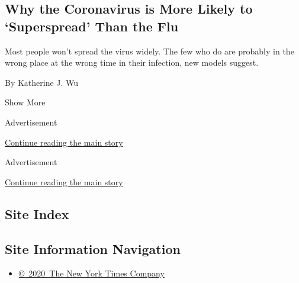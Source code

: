 \begin{enumerate}
  \hypertarget{why-the-coronavirus-is-more-likely-to-superspread-than-the-flu}{%
  \subsection{Why the Coronavirus is More Likely to `Superspread' Than
  the
  Flu}\label{why-the-coronavirus-is-more-likely-to-superspread-than-the-flu}}

  Most people won't spread the virus widely. The few who do are probably
  in the wrong place at the wrong time in their infection, new models
  suggest.

  By Katherine J. Wu
\end{enumerate}

Show More

Advertisement

\protect\hyperlink{after-mid4}{Continue reading the main story}

Advertisement

\protect\hyperlink{after-mktg}{Continue reading the main story}

\hypertarget{site-index}{%
\subsection{Site Index}\label{site-index}}

\hypertarget{site-information-navigation}{%
\subsection{Site Information
Navigation}\label{site-information-navigation}}

\begin{itemize}
\tightlist
\item
  \href{https://help.nytimes.com/hc/en-us/articles/115014792127-Copyright-notice}{©~2020~The
  New York Times Company}
\end{itemize}

